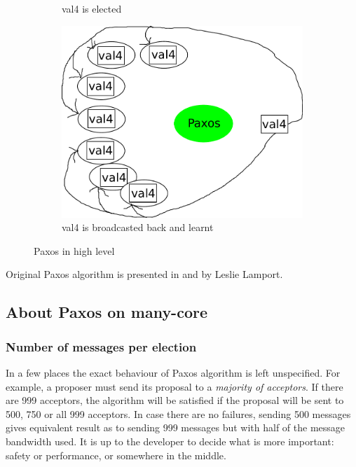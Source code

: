 \documentclass[english,11pt]{l4proj}
\begin{document}
\begin{figure}
\begin{subfigure}[b]{0.32\textwidth}
        \caption{val4 is elected}
    \end{subfigure}\hfill
    \begin{subfigure}[b]{0.32\textwidth}
        \includegraphics[width=\textwidth]{images/paxos3.pdf}
        \caption{val4 is broadcasted back and learnt}
    \end{subfigure}

    \caption{Paxos in high level}
    \label{fig:paxos-highlevel}
\end{figure}

Original Paxos algorithm is presented in \cite{classic-paxos} and
\cite{paxos-simple} by Leslie Lamport.

\subsection{About Paxos on many-core}

\subsubsection{Number of messages per election}

In a few places the exact behaviour of Paxos algorithm is left unspecified. For
example, a proposer must send its proposal to a {\em majority of acceptors}. If
there are 999 acceptors, the algorithm will be satisfied if the proposal will be
sent to 500, 750 or all 999 acceptors. In case there are no failures, sending
500 messages gives equivalent result as to sending 999 messages but with half of
the message bandwidth used. It is up to the developer to decide what is more
important: safety or performance, or somewhere in the middle.
\end{document}
